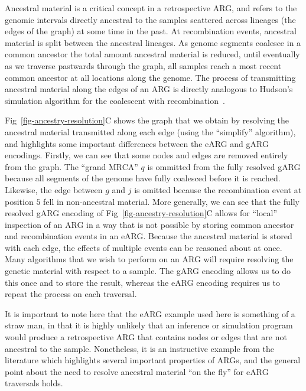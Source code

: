 \documentclass{article}
\begin{document}
Ancestral material is a critical concept in a retrospective ARG,
and refers to the genomic intervals directly ancestral to the samples
scattered across lineages (the edges of the graph)
at some time in the past. At recombination
events, ancestral material is split between the ancestral lineages.
As genome segments coalesce in a common
ancestor the total amount ancestral material is reduced, until
eventually as we traverse pastwards through the graph, all
samples reach a most recent common ancestor at all locations
along the genome. The process of transmitting ancestral material
along the edges of an ARG is directly analogous to Hudson's
simulation algorithm for the coalescent with
recombination~\citep{hudson1983testing,kelleher2016efficient}.

Fig~\ref{fig-ancestry-resolution}C shows the graph that we obtain
by resolving the ancestral material transmitted along each edge
(using the ``simplify'' algorithm), and highlights some important
differences between the eARG and gARG encodings.
Firstly, we can see that some nodes and edges are removed entirely
from the graph. The ``grand MRCA'' $q$ is ommitted from the
fully resolved gARG because all segments of the genome have
fully coalesced before it is reached. Likewise, the edge
between $g$ and $j$ is omitted because the recombination
event at position $5$ fell in non-ancestral material.
More generally, we can see that the fully resolved
gARG encoding of Fig~\ref{fig-ancestry-resolution}C
allows for ``local'' inspection
of an ARG in a way that is not possible by storing
common ancestor and recombination events in an eARG. Because
the ancestral material is stored with each edge, the effects
of multiple events can be reasoned about at once. Many algorithms
that we wish to perform on an ARG will require resolving
the genetic material with respect to a sample.
The gARG encoding
allows us to do this once and to store the result, whereas
the eARG encoding requires us to repeat the process on
each traversal.

It is important to note here that the \citet{wiuf1999recombination} eARG
example used here is something of a straw man, in that it is highly unlikely
that an inference or simulation program would produce a retrospective
ARG that contains
nodes or edges that are not ancestral to the sample. Nonetheless, it
is an instructive example from the literature which highlights several
important properties of ARGs, and the general point about
the need to resolve ancestral material ``on the fly'' for eARG traversals
holds.
\end{document}
